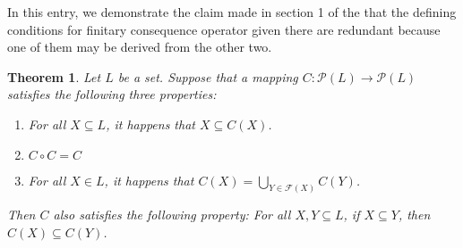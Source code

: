 \documentclass[12pt]{article}
\newtheorem*{theorem}{Theorem}
\begin{document}
In this entry, we demonstrate the claim made in section 1 of the 
 that the defining conditions for 
finitary consequence operator given there are redundant because
one of them may be derived from the other two.

\begin{theorem}
Let $L$ be a set.  Suppose that a mapping $C \colon \mathcal{P}(L) 
\to \mathcal{P}(L)$ satisfies the following three properties:
\begin{enumerate}
\item For all $X \subseteq L$, it happens that $X \subseteq C(X)$.
\item $C \circ C = C$
\item For all $X \in L$, it happens that $C(X) = \bigcup\limits_{Y \in 
\mathcal{F} (X)} C(Y)$.
\end{enumerate}
Then $ C$ also satisfies the following property:  For all $X, Y 
\subseteq L$, if $X \subseteq Y$, then $C(X) \subseteq C(Y)$.
\end{theorem}
\end{document}
